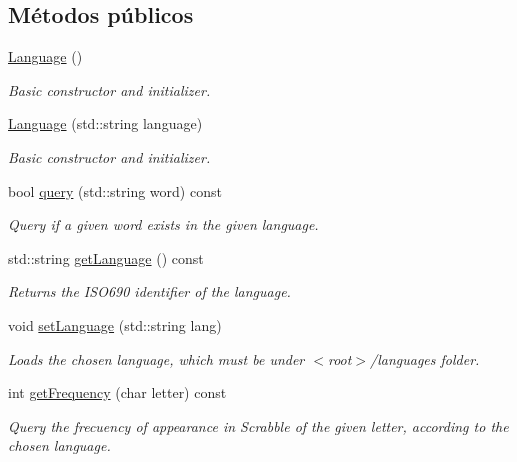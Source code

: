 \subsection*{Métodos públicos}
\begin{DoxyCompactItemize}
\item 
\hyperlink{classLanguage_a09448361f9188bceaaeebc5576cd6896}{Language} ()\hypertarget{classLanguage_a09448361f9188bceaaeebc5576cd6896}{}\label{classLanguage_a09448361f9188bceaaeebc5576cd6896}

\begin{DoxyCompactList}\small\item\em Basic constructor and initializer. \end{DoxyCompactList}\item 
\hyperlink{classLanguage_ad7c92d28e44058ef4c7ea1b413a4b269}{Language} (std\+::string language)
\begin{DoxyCompactList}\small\item\em Basic constructor and initializer. \end{DoxyCompactList}\item 
bool \hyperlink{classLanguage_a677a05e98da32c5c54b6bf6343f80e21}{query} (std\+::string word) const 
\begin{DoxyCompactList}\small\item\em Query if a given word exists in the given language. \end{DoxyCompactList}\item 
std\+::string \hyperlink{classLanguage_ac78d5ca1b8305425b3343b53dca48b25}{get\+Language} () const 
\begin{DoxyCompactList}\small\item\em Returns the I\+S\+O690 identifier of the language. \end{DoxyCompactList}\item 
void \hyperlink{classLanguage_accc1c22d8bba3002a71bea06cecf624b}{set\+Language} (std\+::string lang)
\begin{DoxyCompactList}\small\item\em Loads the chosen language, which must be under $<$root$>$/languages folder. \end{DoxyCompactList}\item 
int \hyperlink{classLanguage_a39a391f8edca1cbdfeea606d968f2c4a}{get\+Frequency} (char letter) const 
\begin{DoxyCompactList}\small\item\em Query the frecuency of appearance in Scrabble of the given letter, according to the chosen language. \end{DoxyCompactList}\item 

\end{DoxyCompactItemize}
